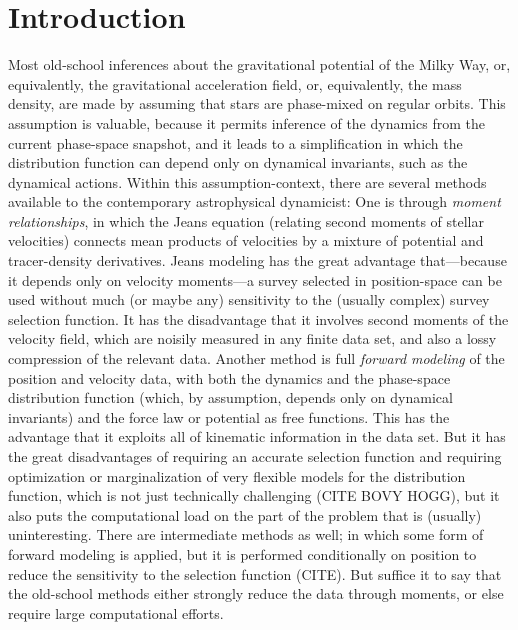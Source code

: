 \documentclass[modern]{aastex62}
\begin{document}

\section{Introduction}

Most old-school inferences about the gravitational potential of the
Milky Way, or, equivalently, the gravitational acceleration field, or,
equivalently, the mass density, are made by assuming that stars are
phase-mixed on regular orbits.
This assumption is valuable, because it permits inference of the
dynamics from the current phase-space snapshot, and it leads to a
simplification in which the distribution function can depend only on
dynamical invariants, such as the dynamical actions.
Within this assumption-context, there are several methods available to the
contemporary astrophysical dynamicist:
One is through \emph{moment relationships}, in which the Jeans equation (relating second moments
of stellar velocities) connects mean products of velocities by a mixture of potential and
tracer-density derivatives.
Jeans modeling has the great advantage that---because it depends only on velocity
moments---a survey selected in position-space can be used without much
(or maybe any) sensitivity to the (usually complex) survey selection
function.
It has the disadvantage that it involves second moments of the velocity
field, which are noisily measured in any finite data set, and also a lossy
compression of the relevant data.
Another method is full \emph{forward modeling} of the position and velocity
data, with both the dynamics and the phase-space distribution function
(which, by assumption, depends only on dynamical invariants) and the
force law or potential as free functions.
This has the advantage that it exploits all of kinematic information in
the data set.
But it has the great disadvantages of requiring an accurate selection function
and requiring optimization or marginalization of very flexible models for
the distribution function, which is not just technically challenging (CITE BOVY HOGG), but it
also puts the computational load on the part of the problem that is (usually)
uninteresting.
There are intermediate methods as well; in which some form of forward
modeling is applied, but it is performed conditionally on position to reduce
the sensitivity to the selection function (CITE).
But suffice it to say that the old-school methods either strongly reduce the
data through moments, or else require large computational efforts.
\end{document}
